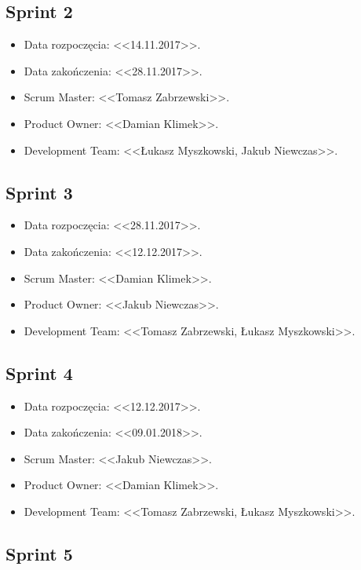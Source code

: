 \documentclass[a4paper]{article}
\begin{document}
	\subsection{Sprint 2}
	
	\begin{itemize}
		\item Data rozpoczęcia: <<14.11.2017>>.
		\item  Data zakończenia: <<28.11.2017>>.
		\item Scrum Master: <<Tomasz Zabrzewski>>.
		\item Product Owner: <<Damian Klimek>>.
		\item Development Team: <<Łukasz Myszkowski, Jakub Niewczas>>.
	\end{itemize}

	\subsection{Sprint 3}

	\begin{itemize}
		\item Data rozpoczęcia: <<28.11.2017>>.
		\item  Data zakończenia: <<12.12.2017>>.
		\item Scrum Master: <<Damian Klimek>>.
		\item Product Owner: <<Jakub Niewczas>>.
		\item Development Team: <<Tomasz Zabrzewski, Łukasz Myszkowski>>.
	\end{itemize}
	
	\subsection{Sprint 4}

	\begin{itemize}
		\item Data rozpoczęcia: <<12.12.2017>>.
		\item  Data zakończenia: <<09.01.2018>>.
		\item Scrum Master: <<Jakub Niewczas>>.
		\item Product Owner: <<Damian Klimek>>.
		\item Development Team: <<Tomasz Zabrzewski, Łukasz Myszkowski>>.
	\end{itemize}

	\subsection{Sprint 5}
\end{document}
